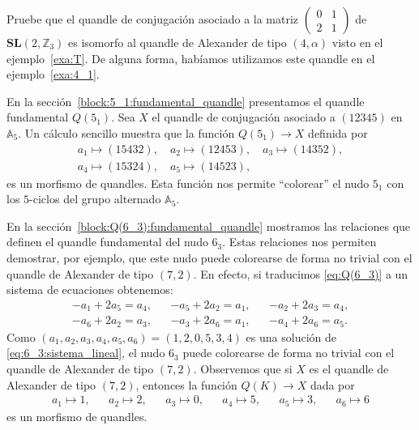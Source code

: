 \documentclass[graybox]{svmult}
\newcommand{\Z}{\mathbb{Z}}
\newcommand{\SL}{\mathbf{SL}}
\newcommand{\Alt}{\mathbb{A}}
\begin{document}

\begin{exercise}
	Pruebe que el quandle de conjugación asociado a la matriz $\begin{pmatrix}0
	& 1\\ 2 & 1\end{pmatrix}$ de $\SL(2,\Z_3)$ es isomorfo al quandle de
	Alexander de tipo $(4,\alpha)$ visto en el ejemplo~\ref{exa:T}.  De alguna
	forma, habíamos utilizamos este quandle en el ejemplo~\ref{exa:4_1}.
\end{exercise}

\begin{example}
	En la sección~\ref{block:5_1:fundamental_quandle} presentamos el quandle
	fundamental $Q(5_1)$.  Sea $X$ el quandle de conjugación asociado a
	$(12345)$ en $\Alt_5$.  Un cálculo sencillo muestra que la función
	$Q(5_1)\to X$ definida por 
	\begin{multline*}
        a_1\mapsto (15432),\quad
        a_2\mapsto (12453),\quad
        a_3\mapsto (14352),\\
        a_4\mapsto (15324),\quad
        a_5\mapsto (14523),
	\end{multline*}
	es un morfismo de quandles. Esta función nos permite ``colorear'' el nudo
	$5_1$ con los $5$-ciclos del grupo alternado $\Alt_5$.
\end{example}

\begin{example}
	\label{exa:6_3}
	En la sección~\ref{block:Q(6_3):fundamental_quandle} mostramos las relaciones que
	definen el quandle fundamental del nudo $6_3$. Estas relaciones nos
	permiten demostrar, por ejemplo, que este nudo puede colorearse de forma no
	trivial con el quandle de Alexander de tipo $(7,2)$. En efecto, si
	traducimos
	\eqref{eq:Q(6_3)} a un sistema de ecuaciones obtenemos:
    \begin{equation}
        \label{eq:6_3:sistema_lineal}
        \begin{aligned}
            -a_1+2a_5=a_4, && -a_5+2a_2=a_1, && -a_2+2a_3=a_4,\\
            -a_6+2a_2=a_3, && -a_3+2a_6=a_1, && -a_4+2a_6=a_5.
        \end{aligned}
    \end{equation}
	Como $(a_1,a_2,a_3,a_4,a_5,a_6)=(1,2,0,5,3,4)$ es una solución de
	\eqref{eq:6_3:sistema_lineal}, el nudo $6_3$ puede colorearse de forma no
	trivial con el quandle de Alexander de tipo $(7,2)$. Observemos que si $X$
	es el quandle de Alexander de tipo $(7,2)$, entonces la función $Q(K)\to X$ dada por 
    \begin{align*}
        a_1\mapsto 1, && 
        a_2\mapsto 2, &&
        a_3\mapsto 0, &&
        a_4\mapsto 5, &&
        a_5\mapsto 3, &&
        a_6\mapsto 6
    \end{align*}
    es un morfismo de quandles.
\end{example}
\end{document}
